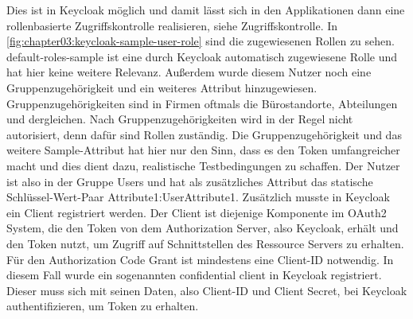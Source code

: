 Dies ist in Keycloak möglich und damit lässt sich in den Applikationen dann eine 
rollenbasierte Zugriffskontrolle realisieren, siehe Zugriffskontrolle. In \autoref{fig:chapter03:keycloak-sample-user-role} sind die zugewiesenen Rollen zu sehen. default-roles-sample ist eine durch Keycloak automatisch 
zugewiesene Rolle und hat hier keine weitere Relevanz. 
Außerdem wurde diesem Nutzer noch eine Gruppenzugehörigkeit und ein weiteres Attribut 
hinzugewiesen. Gruppenzugehörigkeiten sind in Firmen oftmals die Bürostandorte, 
Abteilungen und dergleichen. Nach Gruppenzugehörigkeiten wird in der Regel nicht 
autorisiert, denn dafür sind Rollen zuständig. Die Gruppenzugehörigkeit und das weitere 
Sample-Attribut hat hier nur den Sinn, dass es den Token umfangreicher macht und dies 
dient dazu, realistische Testbedingungen zu schaffen. Der Nutzer ist also in der Gruppe 
Users und hat als zusätzliches Attribut das statische Schlüssel-Wert-Paar Attribute1:UserAttribute1. 
Zusätzlich musste in Keycloak ein Client registriert werden. Der Client ist diejenige 
Komponente im OAuth2 System, die den Token von dem Authorization Server, also 
Keycloak, erhält und den Token nutzt, um Zugriff auf Schnittstellen des Ressource Servers 
zu erhalten. Für den Authorization Code Grant ist mindestens eine Client-ID notwendig. In 
diesem Fall wurde ein sogenannten confidential client in Keycloak registriert. Dieser muss 
sich mit seinen Daten, also Client-ID und Client Secret, bei Keycloak authentifizieren, um 
Token zu erhalten.
